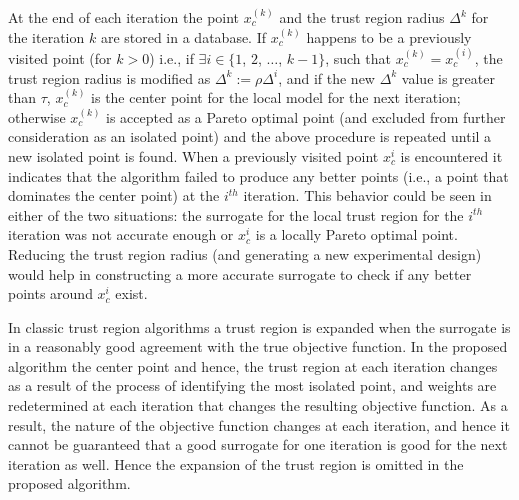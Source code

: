 At the end of each iteration the point $x_c^{(k)}$ and the trust region radius 
$\Delta^k$ for the iteration $k$ are stored in a database. If $x_c^{(k)}$ 
happens to be a previously visited point (for $k > 0$) i.e., if $\exists 
i\in\{1$, $2$, $\ldots$, $k-1\}$, such that $x_c^{(k)} = x_c^{(i)}$, the trust 
region radius is modified as $\Delta^k := \rho\Delta^i$, and if the new 
$\Delta^k$ value is greater than $\tau$, $x_c^{(k)}$ is the center point for 
the local model for the next iteration; otherwise $x_c^{(k)}$ is accepted as a 
Pareto optimal point (and excluded from further consideration as an isolated 
point) and the above procedure is repeated until a new isolated point is 
found. When a previously visited point $x_c^i$ is encountered it indicates 
that the algorithm failed to produce any better points (i.e., a point that
dominates the center point) at the $i^{th}$ iteration. This behavior could 
be seen in either of the two situations: the surrogate for the local trust 
region for the ${i^{th}}$ iteration was not accurate enough or $x_c^i$ is 
a locally Pareto optimal point. Reducing the trust region radius (and 
generating a new experimental design) would help in constructing a more 
accurate surrogate to check if any better points around $x_c^i$ exist. 
\smallskip

In classic trust region algorithms a trust region is expanded when the surrogate 
is in a reasonably good agreement with the true objective function. In the 
proposed algorithm the center point and hence, the trust region at each 
iteration changes as a result of the process of identifying the most isolated 
point, and weights are redetermined at each iteration that changes the resulting 
objective function. As a result, the nature of the objective function changes 
at each iteration, and hence it cannot be guaranteed that a good surrogate for 
one iteration is good for the next iteration as well. Hence the expansion 
of the trust region is omitted in the proposed algorithm. \smallskip

\smallskip

